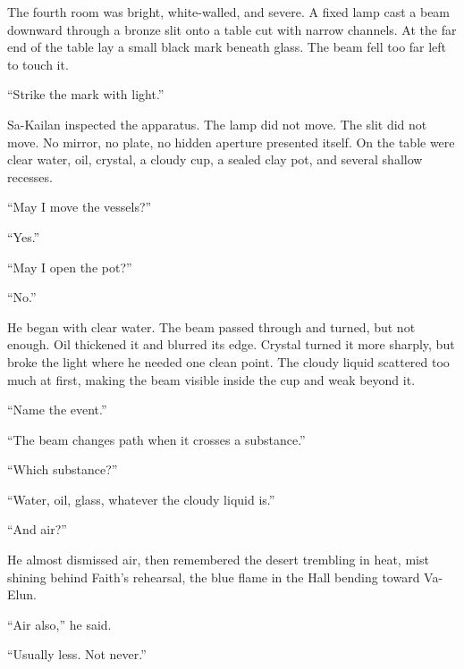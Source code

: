 The fourth room was bright, white-walled, and severe.
A fixed lamp cast a beam downward through a bronze slit onto a table cut with narrow channels.
At the far end of the table lay a small black mark beneath glass.
The beam fell too far left to touch it.\par

“Strike the mark with light.”\par

Sa-Kailan inspected the apparatus.
The lamp did not move.
The slit did not move.
No mirror, no plate, no hidden aperture presented itself.
On the table were clear water, oil, crystal, a cloudy cup, a sealed clay pot, and several shallow recesses.\par

“May I move the vessels?”\par

“Yes.”\par

“May I open the pot?”\par

“No.”\par

He began with clear water.
The beam passed through and turned, but not enough.
Oil thickened it and blurred its edge.
Crystal turned it more sharply, but broke the light where he needed one clean point.
The cloudy liquid scattered too much at first, making the beam visible inside the cup and weak beyond it.\par

“Name the event.”\par

“The beam changes path when it crosses a substance.”\par

“Which substance?”\par

“Water, oil, glass, whatever the cloudy liquid is.”\par

“And air?”\par

He almost dismissed air, then remembered the desert trembling in heat, mist shining behind Faith’s rehearsal, the blue flame in the Hall bending toward Va-Elun.\par

“Air also,” he said.\par

“Usually less.
Not never.”\par

